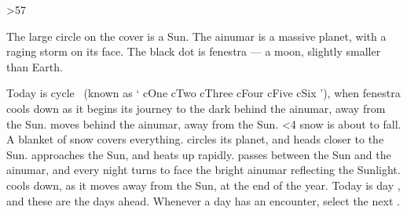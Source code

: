 \documentclass[10pt,twoside]{book}
\newcommand\stateCycle{%
  \ifcase\thecycle%
    \gls{cOne}%
  \or%
    \gls{cTwo}%
  \or%
    \gls{cThree}%
  \or%
    \gls{cFour}%
  \or%
    \gls{cFive}%
  \else%
    \gls{cSix}%
  \fi%
}
\begin{document}
\frontmatter
\setCycle{\month}{\day}
\ifnum\thefenestraDay>57
  \advanceTheDate[2]
\fi



\setcounter{track}{\thecycle}%
%

\noindent%
The large circle on the cover is a Sun.
The \gls{ainumar} is a massive planet, with a raging storm on its face.
The black dot is \gls{fenestra} --- a moon, slightly smaller than Earth.

%
Today is \gls{cycle}~ (known as `\stateCycle'), when \gls{fenestra}
\ifcase\thecycle%
  cools down as it begins its journey to the dark behind the \gls{ainumar}, away from the Sun.
\or%
  moves behind the \gls{ainumar}, away from the Sun.
  \ifnum\thefenestraDay<4%
    \Gls{snow} is about to fall.
  \else%
    A blanket of \gls{snow} covers everything.
  \fi%
\or%
  circles its planet, and heads closer to the Sun.
\or%
  approaches the Sun, and heats up rapidly.
\or%
  passes between the Sun and the \gls{ainumar}, and every night turns to face the bright \gls{ainumar} reflecting the Sunlight.
\else%
  cools down, as it moves away from the Sun, at the end of the year.
\fi%
Today is day \thefenestraDay, and these are the days ahead.
Whenever a day has an encounter, select the next .
\end{document}
